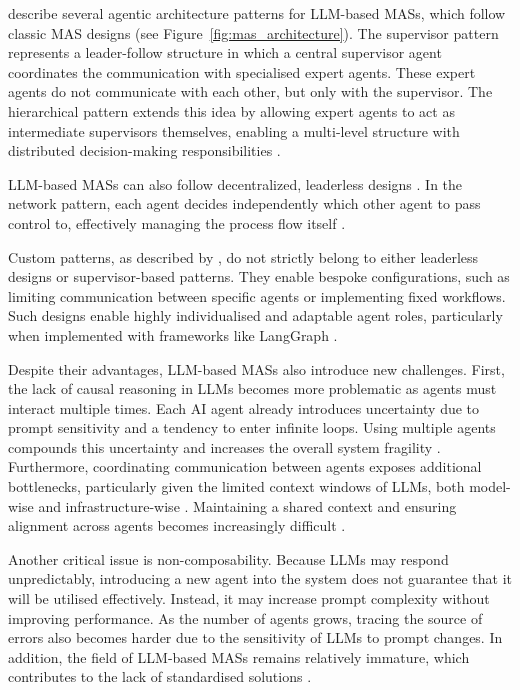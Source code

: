 \documentclass[a4paper,oneside,bibliography=totoc]{scrbook}
\begin{document}
\citet{LangChain2025b} describe several agentic architecture patterns for \ac{LLM}-based \acp{MAS}, which follow classic \ac{MAS} designs (see Figure~\ref{fig:mas_architecture}). The supervisor pattern represents a leader-follow structure in which a central supervisor agent coordinates the communication with specialised expert agents. These expert agents do not communicate with each other, but only with the supervisor. The hierarchical pattern extends this idea by allowing expert agents to act as intermediate supervisors themselves, enabling a multi-level structure with distributed decision-making responsibilities \cite{LangChain2025b}.

\ac{LLM}-based \acp{MAS} can also follow decentralized, leaderless designs \cite{OpenAI2025,LangChain2025b}. In the network pattern, each agent decides independently which other agent to pass control to, effectively managing the process flow itself \cite{LangChain2025b,OpenAI2025}.

Custom patterns, as described by \citet{LangChain2025b}, do not strictly belong to either leaderless designs or supervisor-based patterns. They enable bespoke configurations, such as limiting communication between specific agents or implementing fixed workflows. Such designs enable highly individualised and adaptable agent roles, particularly when implemented with frameworks like LangGraph \cite{LangChain2025b}.

Despite their advantages, \ac{LLM}-based \acp{MAS} also introduce new challenges. First, the lack of causal reasoning in \acp{LLM} becomes more problematic as agents must interact multiple times. Each \ac{AI} agent already introduces uncertainty due to prompt sensitivity and a tendency to enter infinite loops. Using multiple agents compounds this uncertainty and increases the overall system fragility \cite{Sapkota2025}. Furthermore, coordinating communication between agents exposes additional bottlenecks, particularly given the limited context windows of \acp{LLM}, both model-wise and infrastructure-wise \cite{Kwon2023}. Maintaining a shared context and ensuring alignment across agents becomes increasingly difficult \cite{Sapkota2025,Han2025}.

Another critical issue is non-composability. Because \acp{LLM} may respond unpredictably, introducing a new agent into the system does not guarantee that it will be utilised effectively. Instead, it may increase prompt complexity without improving performance. As the number of agents grows, tracing the source of errors also becomes harder due to the sensitivity of \acp{LLM} to prompt changes. In addition, the field of \ac{LLM}-based \acp{MAS} remains relatively immature, which contributes to the lack of standardised solutions \cite{Sapkota2025}.
\end{document}
